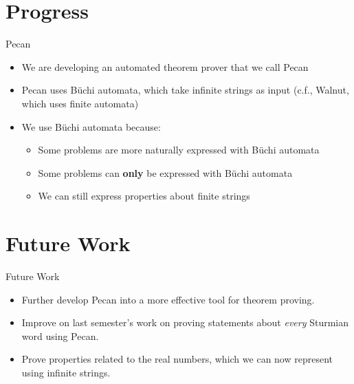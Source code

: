 \documentclass[leqno,presentation]{beamer}
\begin{document}
\section{Progress}

\begin{frame}{Pecan}
\begin{itemize}
    \item We are developing an automated theorem prover that we call Pecan
    \item Pecan uses B\"uchi automata, which take infinite strings as input (c.f., Walnut, which uses finite automata)
    \item We use B\"uchi automata because:
        \begin{itemize}
            \item Some problems are more naturally expressed with B\"uchi automata
            \item Some problems can \textbf{only} be expressed with B\"uchi automata
            \item We can still express properties about finite strings
        \end{itemize}
\end{itemize}
\end{frame}

\section{Future Work}

\begin{frame}{Future Work}
\begin{itemize}
    \item Further develop Pecan into a more effective tool for theorem proving.

    \item Improve on last semester's work on proving statements about \emph{every} Sturmian word using Pecan.
    
    \item Prove properties related to the real numbers, which we can now represent using infinite strings.
\end{itemize}
\end{frame}
\end{document}
